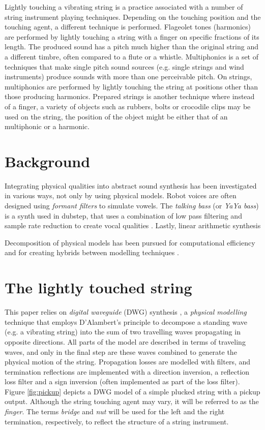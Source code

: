 \documentclass{sigchi}
\begin{document}
Lightly touching a vibrating string is a practice associated with a number of string instrument playing techniques.
Depending on the touching position and the touching agent, a different technique is performed.
Flageolet tones (harmonics) are performed by lightly touching a string with a finger on specific fractions of its length.
The produced sound has a pitch much higher than the original string and a different timbre, often compared to a flute or a whistle.
Multiphonics is a set of techniques that make single pitch sound sources (e.g. single strings and wind instruments) produce sounds with more than one perceivable pitch.
On strings, multiphonics are performed by lightly touching the string at positions other than those producing harmonics.
Prepared strings is another technique where instead of a finger, a variety of objects such as rubbers, bolts or crocodile clips may be used on the string, the position of the object might be either that of an multiphonic or a harmonic.

\section{Background}
Integrating physical qualities into abstract sound synthesis has been investigated in various ways, not only by using physical models.
Robot voices are often designed using \textit{formant filters} to simulate vowels.
The \textit{talking bass} (or \textit{YaYa bass}) is a synth used in dubstep, that uses a combination of low pass filtering and sample rate reduction to create vocal qualities \cite{audio_digital_how_2014, dorincourt_reason_2010}.
Lastly, linear arithmetic synthesis

Decomposition of physical models has been pursued for computational efficiency \cite{karjalainen_plucked-string_1998} and for creating hybrids between modelling techniques \cite{erkut_modular_2005}.


\section{The lightly touched string}

This paper relies on \textit{digital waveguide} (DWG) synthesis \cite{smith_physical_1992}, a \textit{physical modelling} technique that employs D'Alambert's principle to decompose a standing wave (e.g. a vibrating string) into the sum of two travelling waves propagating in opposite directions.
All parts of the model are described in terms of traveling waves, and only in the final step are these waves combined to generate the physical motion of the string.
Propagation losses are modelled with filters, and termination reflections are implemented with a direction inversion, a reflection loss filter and a sign inversion (often implemented as part of the loss filter).
Figure \ref{fig:pickup} depicts a DWG model of a simple plucked string with a pickup output.
Although the string touching agent may vary, it will be referred to as the \textit{finger}.
The terms \textit{bridge} and \textit{nut} will be used for the left and the right termination, respectively, to reflect the structure of a string instrument.
\end{document}
